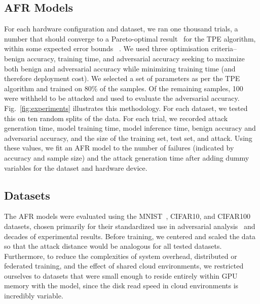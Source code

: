 \documentclass[conference]{IEEEtran}
\begin{document}
\subsection{AFR Models}

For each hardware configuration and dataset, we ran one thousand trials, a number that should converge to a Pareto-optimal result~\cite{ozaki2020multiobjective,zitzler2008quality} for the TPE algorithm, within some expected error bounds ~\cite{legriel2010approximating}. We used three optimisation criteria-- benign accuracy, training time, and adversarial accuracy seeking to maximize both benign and adversarial accuracy while minimizing training time (and therefore deployment cost). We selected a set of parameters as per the TPE algorithm and trained on 80\% of the samples. Of the remaining samples, 100 were withheld to be attacked and used to evaluate the adversarial accuracy. Fig.~\ref{fig:experiments} illustrates this methodology. For each dataset, we tested this on ten random splits of the data. For each trial, we recorded attack generation time, model training time, model inference time, benign accuracy and adversarial accuracy, and the size of the training set, test set, and attack. Using these values, we fit an AFR model to the number of failures (indicated by accuracy and sample size) and the attack generation time after adding dummy variables for the dataset and hardware device.  

\subsection{Datasets}
The AFR models were evaluated using the MNIST~\cite{mnist}, CIFAR10\cite{cifar}, and CIFAR100\cite{cifar} datasets, chosen primarily for their standardized use in adversarial analysis~\cite{madry2017towards,croce_reliable_2020,carlini_towards_2017,deepfool} and decades of experimental results.
Before training, we centered and scaled the data so that the attack distance would be analogous for all tested datasets. Furthermore, to reduce the complexities of system overhead, distributed or federated training, and the effect of shared cloud environments, we restricted ourselves to datasets that were small enough to reside entirely within GPU memory with the model, since the disk read speed in cloud environments is incredibly variable.
\end{document}
